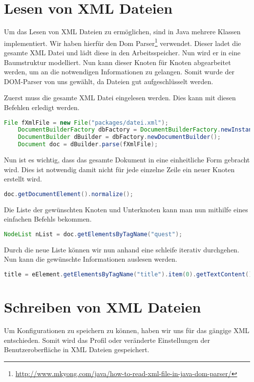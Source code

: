 \section{Lesen von XML Dateien}
\label{sec:xml-read}
Um das Lesen von XML Dateien zu ermöglichen, sind in Java mehrere Klassen implementiert. Wir haben hierfür den Dom Parser\footnote{\url{http://www.mkyong.com/java/how-to-read-xml-file-in-java-dom-parser/}} verwendet. Dieser ladet die gesamte XML Datei und lädt diese in den Arbeitsspeicher. Nun wird er in eine Baumstruktur modelliert. Nun kann dieser Knoten für Knoten abgearbeitet werden, um an die notwendigen Informationen zu gelangen. Somit wurde der DOM-Parser von uns gewählt, da Dateien gut aufgeschlüsselt werden.

Zuerst muss die gesamte XML Datei eingelesen werden. Dies kann mit diesen Befehlen erledigt werden.
\begin{lstlisting}[language=JAVA]
	File fXmlFile = new File("packages/datei.xml");
	DocumentBuilderFactory dbFactory = DocumentBuilderFactory.newInstance();
	DocumentBuilder dBuilder = dbFactory.newDocumentBuilder();
	Document doc = dBuilder.parse(fXmlFile);
\end{lstlisting}

Nun ist es wichtig, dass das gesamte Dokument in eine einheitliche Form gebracht wird. Dies ist notwendig damit nicht für jede einzelne Zeile ein neuer Knoten erstellt wird.
\begin{lstlisting}[language=JAVA]
	doc.getDocumentElement().normalize();
\end{lstlisting}

Die Liste der gewünschten Knoten und Unterknoten kann man nun mithilfe eines einfachen Befehls bekommen.
\begin{lstlisting}[language=JAVA]
	NodeList nList = doc.getElementsByTagName("quest");
\end{lstlisting}
Durch die neue Liste können wir nun anhand eine schleife iterativ durchgehen. Nun kann die gewünschte Informationen auslesen werden. 
\begin{lstlisting}[language=JAVA]
title = eElement.getElementsByTagName("title").item(0).getTextContent();
\end{lstlisting}

\section{Schreiben von XML Dateien}
\label{sec:xml-write}
Um Konfigurationen zu speichern zu können, haben wir uns für das gängige XML entschieden. Somit wird das Profil oder veränderte Einstellungen der Benutzeroberfläche in XML Dateien gespeichert.

